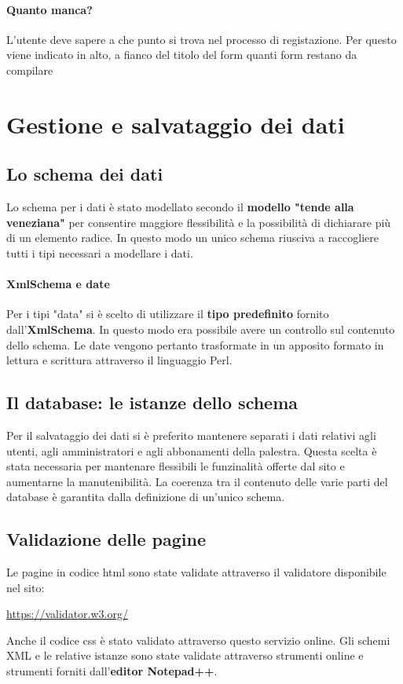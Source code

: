 \documentclass[12pt,a4paper]{article}
\begin{document}
\paragraph{Quanto manca?} L'utente deve sapere a che punto si trova nel processo di registazione. Per questo viene indicato in alto, a fianco del titolo del form quanti form restano da compilare
\section{Gestione e salvataggio dei dati}
\subsection{Lo schema dei dati}
Lo schema per i dati è stato modellato secondo il \textbf{modello "tende alla veneziana"} per consentire maggiore flessibilità e la possibilità di dichiarare più di un elemento radice.
In questo modo un unico schema riusciva a raccogliere tutti i tipi necessari a modellare i dati.

\paragraph{XmlSchema e date} Per i tipi "data" si è scelto di utilizzare il \textbf{tipo predefinito} fornito dall'\textbf{XmlSchema}. In questo modo era possibile avere un controllo sul contenuto dello schema. Le date vengono pertanto trasformate in un apposito formato in lettura e scrittura attraverso il linguaggio Perl. 
\subsection{Il database: le istanze dello schema}
Per il salvataggio dei dati si è preferito mantenere separati i dati relativi agli utenti, agli amministratori e agli abbonamenti della palestra. 
Questa scelta è stata necessaria per mantenare flessibili le funzinalità offerte dal sito e aumentarne la manutenibilità.
La coerenza tra il contenuto delle varie parti del database è garantita dalla definizione di un'unico schema. 
\subsection{Validazione delle pagine}
Le pagine in codice html sono state validate attraverso il validatore disponibile nel sito:
\begin{center} \url{https://validator.w3.org/}	\end{center} Anche il codice css è stato validato attraverso questo servizio online. 
Gli schemi XML e le relative istanze sono state validate attraverso strumenti online e strumenti forniti dall'\textbf{editor Notepad++}. 
\appendix
\end{document}
